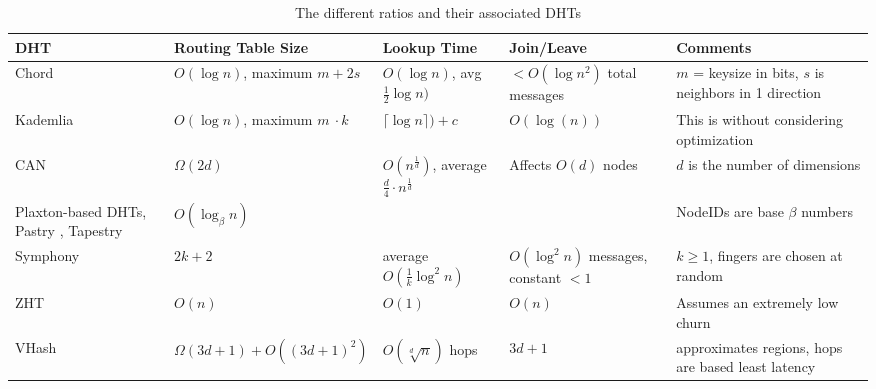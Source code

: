 \begin{table}[h]
	\small
	\centering
	\begin{tabularx}{\textwidth}{ |X|X|X|X|X| }
		\hline
		DHT & Routing Table Size & Lookup Time & Join/Leave & Comments \\ \hline  
		
		Chord \cite{chord} & $O(\log n)$, maximum $m +2s$ & $O(\log n)$, avg $\frac{1}{2} \log n)$  &  $<O(\log n^{2})$ total messages& $m$  = keysize in bits, $s$ is neighbors in 1 direction  \\ \hline
		
		Kademlia \cite{kademlia} & $O(\log n)$, maximum $m\ \cdot k$ & $\lceil \log n\rceil) + c$ & $O(\log(n))$& This is without considering optimization   \\ \hline
		CAN \cite{can} & $\Omega(2d)$ & $O(n^{\frac{1}{d}})$, average $\frac{d}{4}\cdot n^{\frac{1}{d}}$ & Affects $O(d)$ nodes & $d$ is the number of dimensions \\ \hline
		
		Plaxton-based DHTs, Pastry \cite{pastry}, Tapestry \cite{tapestry} & $O(\log_{\beta} n)$ & & &  NodeIDs are base $\beta$ numbers \\ \hline
		
        Symphony \cite{symphony}& $2k + 2$&   average $O(\frac{1}{k} \log^{2} n )$ & $O(\log^{2} n)$ messages,  constant $<1$ &  $k \geq 1$, fingers are chosen at random\\ \hline  
		
        ZHT \cite{li2013zht}&   $O(n)$& $O(1)$ &  $O(n)$ & Assumes an extremely low churn \\ \hline
        
        VHash & $\Omega(3d+1) + O((3d+1)^{2})$ & $O(\sqrt[d]{n})$ hops & $3d + 1$ & approximates regions, hops are based least latency\\ \hline
	\end{tabularx}
	\caption{The different ratios and their associated DHTs}
	\label{tab:tradeoffs}
\end{table}




